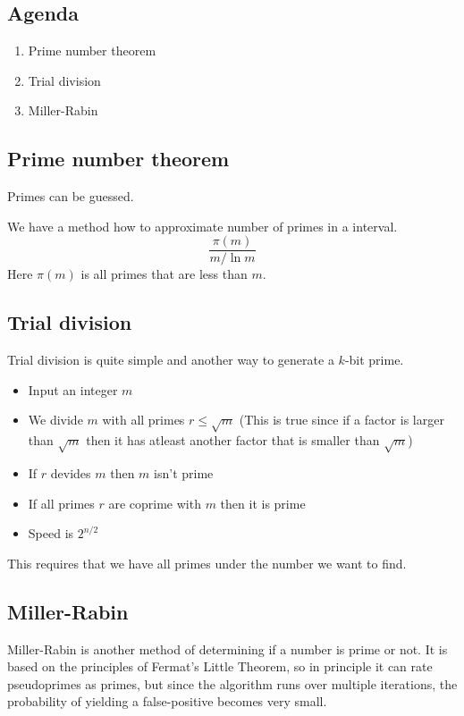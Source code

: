 

\subsection*{Agenda}
\begin{enumerate}
\item Prime number theorem
\item Trial division
\item Miller-Rabin
\end{enumerate}

\subsection{Prime number theorem}
Primes can be guessed.

We have a method how to approximate number of primes in a interval.
\[ \frac{\pi (m)}{m/\ln m} \]
Here $\pi (m)$ is all primes that are less than $m$.

\subsection{Trial division}
Trial division is quite simple and another way to generate a $k$-bit
prime.
\begin{itemize}
\item Input an integer $m$
\item We divide $m$ with all primes $r\le \sqrt{m}$ (This is true since
  if a factor is larger than $\sqrt{m}$ then it has atleast another
  factor that is smaller than $\sqrt{m}$)
\item If $r$ devides $m$ then $m$ isn't prime
\item If all primes $r$ are coprime with $m$ then it is prime
\item Speed is $2^{n/2}$
\end{itemize}
This requires that we have all primes under the number we want to find.

\subsection{Miller-Rabin}
Miller-Rabin is another method of determining if a number is prime or
not. It is based on the principles of Fermat's Little Theorem, so in
principle it can rate pseudoprimes as primes, but since the algorithm
runs over multiple iterations, the probability of yielding a
false-positive becomes very small.

